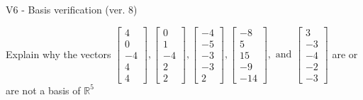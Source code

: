 \begin{exercise}
  \begin{exerciseTitle}V6 - Basis verification (ver. 8)\end{exerciseTitle}
  \begin{exerciseStatement}
    Explain why the vectors \(\left[\begin{array}{r}
4 \\
0 \\
-4 \\
4 \\
4
\end{array}\right] , \left[\begin{array}{r}
0 \\
1 \\
-4 \\
2 \\
2
\end{array}\right] , \left[\begin{array}{r}
-4 \\
-5 \\
-3 \\
-3 \\
2
\end{array}\right] , \left[\begin{array}{r}
-8 \\
5 \\
15 \\
-9 \\
-14
\end{array}\right] , \text{ and } \left[\begin{array}{r}
3 \\
-3 \\
-4 \\
-2 \\
-3
\end{array}\right]\) are or are not a basis of \(\mathbb{R}^5\)	



\end{exerciseStatement}
\end{exercise}
